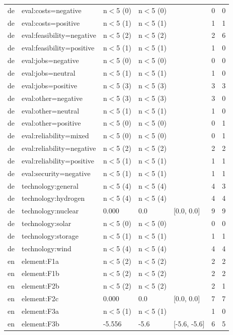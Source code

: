 \begin{table}[htbp]
\begin{tabular}{lllllll}
de & eval:costs=negative & n$<$5 (0) & n$<$5 (0) &  & 0 & 0 \\
de & eval:costs=positive & n$<$5 (1) & n$<$5 (1) &  & 1 & 1 \\
de & eval:feasibility=negative & n$<$5 (2) & n$<$5 (2) &  & 2 & 6 \\
de & eval:feasibility=positive & n$<$5 (1) & n$<$5 (1) &  & 1 & 0 \\
de & eval:jobs=negative & n$<$5 (0) & n$<$5 (0) &  & 0 & 0 \\
de & eval:jobs=neutral & n$<$5 (1) & n$<$5 (1) &  & 1 & 0 \\
de & eval:jobs=positive & n$<$5 (3) & n$<$5 (3) &  & 3 & 3 \\
de & eval:other=negative & n$<$5 (3) & n$<$5 (3) &  & 3 & 0 \\
de & eval:other=neutral & n$<$5 (1) & n$<$5 (1) &  & 1 & 0 \\
de & eval:other=positive & n$<$5 (0) & n$<$5 (0) &  & 0 & 1 \\
de & eval:reliability=mixed & n$<$5 (0) & n$<$5 (0) &  & 0 & 1 \\
de & eval:reliability=negative & n$<$5 (2) & n$<$5 (2) &  & 2 & 2 \\
de & eval:reliability=positive & n$<$5 (1) & n$<$5 (1) &  & 1 & 1 \\
de & eval:security=negative & n$<$5 (1) & n$<$5 (1) &  & 1 & 1 \\
de & technology:general & n$<$5 (4) & n$<$5 (4) &  & 4 & 3 \\
de & technology:hydrogen & n$<$5 (4) & n$<$5 (4) &  & 4 & 4 \\
de & technology:nuclear & 0.000 & 0.0 & [0.0, 0.0] & 9 & 9 \\
de & technology:solar & n$<$5 (0) & n$<$5 (0) &  & 0 & 0 \\
de & technology:storage & n$<$5 (1) & n$<$5 (1) &  & 1 & 1 \\
de & technology:wind & n$<$5 (4) & n$<$5 (4) &  & 4 & 4 \\
en & element:F1a & n$<$5 (2) & n$<$5 (2) &  & 2 & 2 \\
en & element:F1b & n$<$5 (2) & n$<$5 (2) &  & 2 & 2 \\
en & element:F2b & n$<$5 (2) & n$<$5 (2) &  & 2 & 1 \\
en & element:F2c & 0.000 & 0.0 & [0.0, 0.0] & 7 & 7 \\
en & element:F3a & n$<$5 (1) & n$<$5 (1) &  & 1 & 0 \\
en & element:F3b & -5.556 & -5.6 & [-5.6, -5.6] & 6 & 5 \\

\end{tabular}
\end{table}
